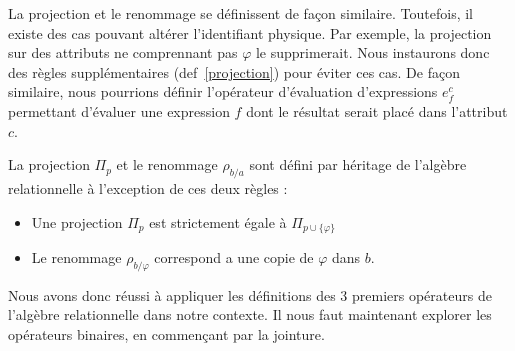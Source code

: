La projection et le renommage se définissent de façon similaire. Toutefois, il existe des cas pouvant altérer l'identifiant physique. Par exemple, la projection sur des attributs ne comprennant pas $\varphi$ le supprimerait. Nous instaurons donc des règles supplémentaires (def~\ref{projection}) pour éviter ces cas. De façon similaire, nous pourrions définir l'opérateur d'évaluation d'expressions $e_f^c$ permettant d'évaluer une expression $f$ dont le résultat serait placé dans l'attribut $c$.
\begin{defi}\label{def:projection}
La projection $\Pi_p$ et le renommage $\rho_{b/a}$ sont défini par héritage de l'algèbre relationnelle à l'exception de ces deux règles :
\begin{itemize}
\item Une projection $\Pi_p$ est strictement égale à $\Pi_{p\cup \{\varphi\}}$
\item Le renommage $\rho_{b/\varphi}$ correspond a une copie de $\varphi$ dans $b$.
\end{itemize}
\end{defi}

Nous avons donc réussi à appliquer les définitions des 3 premiers opérateurs de l'algèbre relationnelle dans notre contexte. Il nous faut maintenant explorer les opérateurs binaires, en commençant par la jointure.

